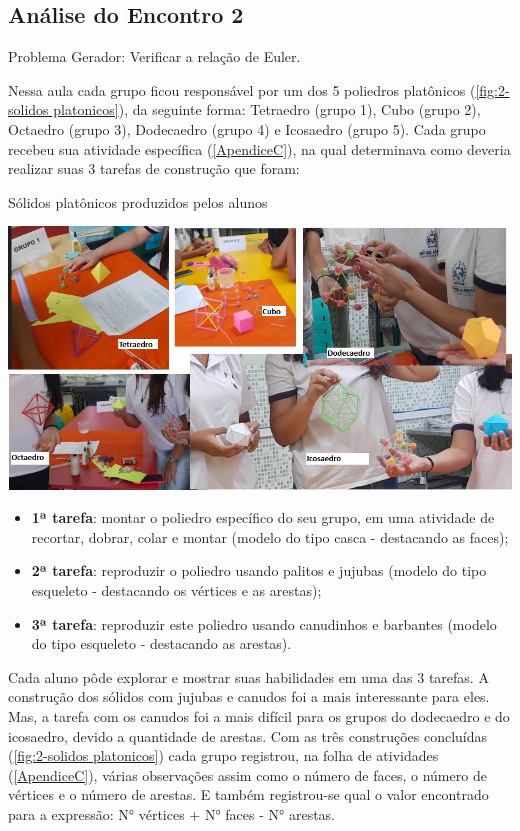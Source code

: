 \subsection{Análise do Encontro 2}

Problema Gerador: Verificar a relação de Euler.

Nessa aula cada grupo ficou responsável por um dos 5 poliedros platônicos (\autoref{fig:2-solidos platonicos}), da seguinte forma:  Tetraedro (grupo 1), Cubo (grupo 2), Octaedro (grupo 3), Dodecaedro  (grupo 4) e Icosaedro (grupo 5). Cada grupo recebeu sua atividade específica (\autoref{ApendiceC}), na qual determinava como deveria realizar suas 3 tarefas de construção que foram:

\begin{CenteredFigure}
    \caption{Sólidos platônicos produzidos pelos alunos} \label{fig:2-solidos platonicos}
    \includegraphics[width=\linewidth]{Imagens/Novas imagens/Sólidos Platônicos compilado}
    \legend{\autoria}
\end{CenteredFigure}

\begin{itemize}
    \item \textbf{1ª tarefa}:  montar o poliedro específico do seu grupo, em uma atividade de recortar, dobrar, colar e montar (modelo do tipo casca - destacando as faces);
    \item \textbf{2ª tarefa}: reproduzir o poliedro usando palitos e jujubas (modelo do tipo esqueleto - destacando os  vértices e as arestas);
    \item \textbf{3ª tarefa}: reproduzir este poliedro usando canudinhos e barbantes (modelo do tipo esqueleto - destacando as arestas).
\end{itemize}

Cada aluno pôde explorar e mostrar suas habilidades em uma das 3 tarefas. A construção dos sólidos com jujubas e canudos foi a mais interessante para eles. Mas, a tarefa com os canudos foi a mais difícil para os grupos do dodecaedro e do icosaedro, devido a quantidade de arestas. Com as três construções concluídas (\autoref{fig:2-solidos platonicos}) cada grupo registrou, na folha de atividades (\autoref{ApendiceC}), várias observações assim como o número de faces, o número de vértices e o número de arestas. E também registrou-se qual o valor encontrado para a expressão: N° vértices + N° faces - N° arestas.

